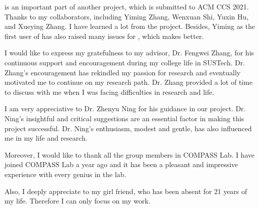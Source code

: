 \TheName is an important part of another project, which is submitted to ACM CCS 2021. Thanks to my collaborators, including Yiming Zhang, Wenxuan Shi, Yuxin Hu, and Xueying Zhang. I have learned a lot from the project. Besides, Yiming as the first user of \TheName has also raised many issues for \TheName, which makes \TheName better.

I would like to express my gratefulness to my advisor, Dr. Fengwei Zhang, for his continuous support and encouragement during my college life in SUSTech.  Dr. Zhang's encouragement has rekindled my passion for research and eventually motivated me to continue on my research path. Dr. Zhang provided a lot of time to discuss with me when I was facing difficulties in research and life.

I am very appreciative to Dr. Zhenyu Ning for his guidance in our project. Dr. Ning's insightful and critical suggestions are an essential factor in making this project successful. Dr. Ning's enthusiasm, modest and gentle, has also influenced me in my life and research.

Moreover, I would like to thank all the group members in COMPASS Lab. I have joined COMPASS Lab a year ago and it has been a pleasant and impressive experience with every genius in the lab. 

Also, I deeply appreciate to my girl friend, who has been absent for 21 years of my life. Therefore I can only focus on my work. 